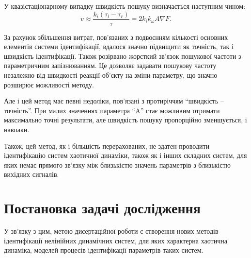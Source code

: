 У квазістаціонарному випадку швидкість пошуку визначається
наступним чином:
%
\begin{equation}
\label{atu:eq:vugpk2}
  v
  \approx
  \frac{k_i (\tau_l - \tau_r)}{\tau}
  =
  2 k_i k_\omega A \nabla F .
\end{equation}

За рахунок збільшення витрат, пов'язаних з подвоєнням кількості
основних елементів системи ідентифікації, вдалося значно
підвищити як точність, так і швидкість ідентифікації.
Також розірвано жорсткий зв'язок пошукової частоти з
параметричним запізнюванням. Це дозволяє задавати
пошукову частоту незалежно від швидкості реакції об'єкту
на зміни параметру, що значно розширює можливості методу.

Але і цей метод має певні недоліки, пов'язані
з протиріччям ``швидкість -- точність''.
При малих значеннях параметра ``A''
стає можливим отримати максимально точні результати,
але швидкість пошуку пропорційно зменшується,
і навпаки.

Також, цей метод, як і більшість перерахованих,
не здатен проводити ідентифікацію  систем хаотичної динаміки,
також як і інших складних систем, для яких немає
прямого зв'язку між
близькістю значень параметрів з близькістю вихідних сигналів.










%
%
%

\section{Постановка задачі дослідження}%



У зв'язку з цим, метою дисертаційної роботи є створення
нових методів ідентифікації нелінійних динамічних систем,
для яких характерна хаотична динаміка,
моделей процесів ідентифікації параметрів таких систем.

